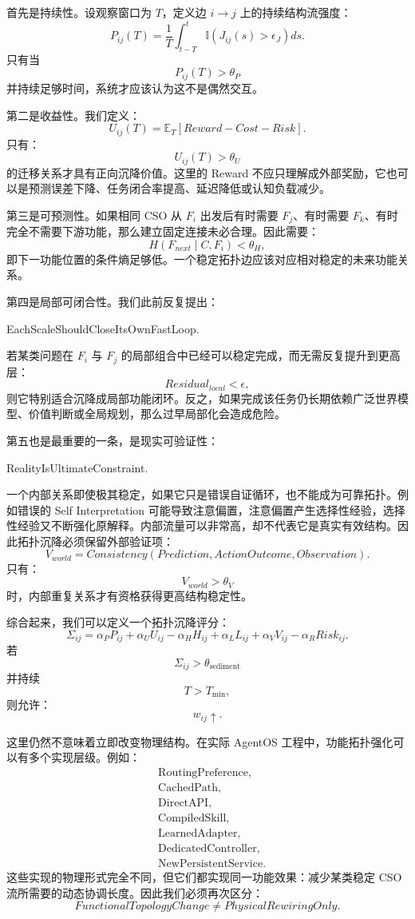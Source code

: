 首先是持续性。设观察窗口为 $T$，定义边 $i\rightarrow j$ 上的持续结构流强度：
\[
P_{ij}(T)
=
\frac{1}{T}
\int_{t-T}^{t}
\mathbb{I}
\left(
J_{ij}(s)>\epsilon_J
\right)
ds.
\]
只有当
\[
P_{ij}(T)>\theta_P
\]
并持续足够时间，系统才应该认为这不是偶然交互。

第二是收益性。我们定义：
\[
U_{ij}(T)
=
\mathbb E_T
\left[
Reward
-
Cost
-
Risk
\right].
\]
只有：
\[
U_{ij}(T)>\theta_U
\]
的迁移关系才具有正向沉降价值。这里的 Reward 不应只理解成外部奖励，它也可以是预测误差下降、任务闭合率提高、延迟降低或认知负载减少。

第三是可预测性。如果相同 CSO 从 $F_i$ 出发后有时需要 $F_j$、有时需要 $F_k$、有时完全不需要下游功能，那么建立固定连接未必合理。因此需要：
\[
H
\left(
F_{next}\mid C,F_i
\right)
<
\theta_H,
\]
即下一功能位置的条件熵足够低。一个稳定拓扑边应该对应相对稳定的未来功能关系。

第四是局部可闭合性。我们此前反复提出：
\begin{statementbox}
EachScaleShouldCloseItsOwnFastLoop.
\end{statementbox}
若某类问题在 $F_i$ 与 $F_j$ 的局部组合中已经可以稳定完成，而无需反复提升到更高层：
\[
Residual_{local}
<
\epsilon,
\]
则它特别适合沉降成局部功能闭环。反之，如果完成该任务仍长期依赖广泛世界模型、价值判断或全局规划，那么过早局部化会造成危险。

第五也是最重要的一条，是现实可验证性：
\begin{statementbox}
RealityIsUltimateConstraint.
\end{statementbox}
一个内部关系即使极其稳定，如果它只是错误自证循环，也不能成为可靠拓扑。例如错误的 Self Interpretation 可能导致注意偏置，注意偏置产生选择性经验，选择性经验又不断强化原解释。内部流量可以非常高，却不代表它是真实有效结构。因此拓扑沉降必须保留外部验证项：
\[
V_{world}
=
Consistency
\left(
Prediction,
ActionOutcome,
Observation
\right).
\]
只有：
\[
V_{world}>\theta_V
\]
时，内部重复关系才有资格获得更高结构稳定性。

综合起来，我们可以定义一个拓扑沉降评分：
\[
\Sigma_{ij}
=
\alpha_P P_{ij}
+
\alpha_U U_{ij}
-
\alpha_H H_{ij}
+
\alpha_L L_{ij}
+
\alpha_V V_{ij}
-
\alpha_R Risk_{ij}.
\]
若
\[
\Sigma_{ij}
>
\theta_{\mathrm{sediment}}
\]
并持续
\[
T>T_{\min},
\]
则允许：
\[
w_{ij}\uparrow.
\]

这里仍然不意味着立即改变物理结构。在实际 AgentOS 工程中，功能拓扑强化可以有多个实现层级。例如：
\[
\begin{aligned}
&\text{RoutingPreference},\\
&\text{CachedPath},\\
&\text{DirectAPI},\\
&\text{CompiledSkill},\\
&\text{LearnedAdapter},\\
&\text{DedicatedController},\\
&\text{NewPersistentService}.
\end{aligned}
\]
这些实现的物理形式完全不同，但它们都实现同一功能效果：减少某类稳定 CSO 流所需要的动态协调长度。因此我们必须再次区分：
\[
\boxed{
FunctionalTopologyChange
\neq
PhysicalRewiringOnly.
}
\]

